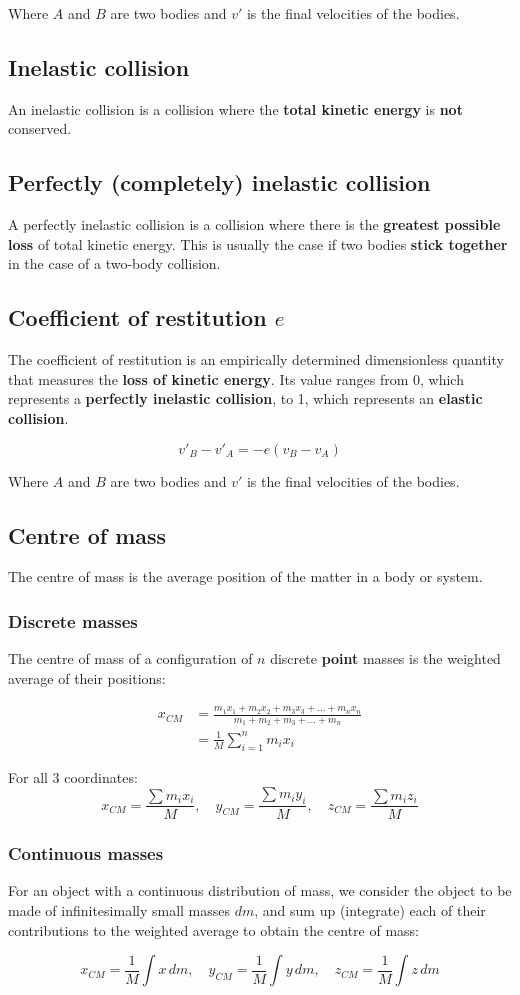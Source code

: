 \documentclass[11pt]{article}
\begin{document}
Where \(A\) and \(B\) are two bodies and \(v'\) is the final velocities of the bodies.
\subsection{Inelastic collision}
\label{sec:org7ff6e73}
An inelastic collision is a collision where the \textbf{total kinetic energy} is \textbf{not} conserved.
\subsection{Perfectly (completely) inelastic collision}
\label{sec:org85aa471}
A perfectly inelastic collision is a collision where there is the \textbf{greatest possible loss} of total kinetic energy. This is usually the case if two bodies \textbf{stick together} in the case of a two-body collision.
\subsection{Coefficient of restitution \(e\)}
\label{sec:org2d57b8f}
The coefficient of restitution is an empirically determined dimensionless quantity that measures the \textbf{loss of kinetic energy}. Its value ranges from 0, which represents a \textbf{perfectly inelastic collision}, to 1, which represents an \textbf{elastic collision}.

\[v'_B - v'_A = - e(v_B - v_A)\]

Where \(A\) and \(B\) are two bodies and \(v'\) is the final velocities of the bodies.

\newpage
\subsection{Centre of mass}
\label{sec:orgbf6ffb6}
The centre of mass is the average position of the matter in a body or system.
\subsubsection{Discrete masses}
\label{sec:orgfd731a6}
The centre of mass of a configuration of \(n\) discrete \textbf{point} masses is the weighted average of their positions:

\begin{align*}
x_{CM} &= \frac{m_1 x_1 + m_2 x_2 + m_3 x_3 + \ldots + m_n x_n}{m_1 + m_2 + m_3 + \ldots + m_n} \\
&= \frac{1}{M} \sum_{i = 1}^n m_i x_i
\end{align*}

For all 3 coordinates:
\[x_{CM} = \frac{\sum m_i x_i}{M}, \quad y_{CM} = \frac{\sum m_i y_i}{M}, \quad z_{CM} = \frac{\sum m_i z_i}{M}\]
\subsubsection{Continuous masses}
\label{sec:org3506faf}
For an object with a continuous distribution of mass, we consider the object to be made of infinitesimally small masses \(dm\), and sum up (integrate) each of their contributions to the weighted average to obtain the centre of mass:

\[x_{CM} = \frac{1}{M} \int x \, dm, \quad y_{CM} = \frac{1}{M} \int y \, dm, \quad z_{CM} = \frac{1}{M} \int z \, dm\]
\end{document}
